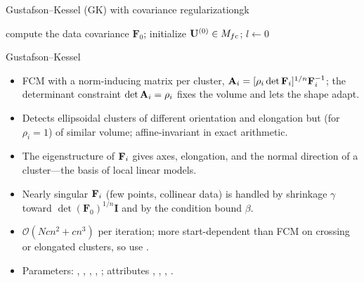 \begin{algobox}{Gustafson--Kessel (GK) with covariance regularization}{gk}
\begin{algorithm}[H]
compute the data covariance $\mathbf{F}_0$; initialize $\mathbf{U}^{(0)}\in M_{fc}$; $l\leftarrow0$\;
\end{algorithm}
\end{algobox}
\begin{summarybox}{Gustafson--Kessel}
\begin{itemize}
  \item FCM with a norm-inducing matrix per cluster, $\mathbf{A}_i=[\rho_i\det\mathbf{F}_i]^{1/n}\mathbf{F}_i^{-1}$; the determinant constraint $\det\mathbf{A}_i=\rho_i$ fixes the volume and lets the shape adapt.
  \item Detects ellipsoidal clusters of different orientation and elongation but (for $\rho_i=1$) of similar volume; affine-invariant in exact arithmetic.
  \item The eigenstructure of $\mathbf{F}_i$ gives axes, elongation, and the normal direction of a cluster---the basis of local linear models.
  \item Nearly singular $\mathbf{F}_i$ (few points, collinear data) is handled by shrinkage $\gamma$ toward $\det(\mathbf{F}_0)^{1/n}\mathbf{I}$ and by the condition bound $\beta$.
  \item $\mathcal{O}(Ncn^2+cn^3)$ per iteration; more start-dependent than FCM on crossing or elongated clusters, so use .
  \item Parameters: , , , , ; attributes , , , .
\end{itemize}
\end{summarybox}

